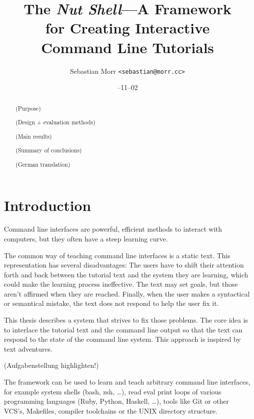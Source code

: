 \documentclass[paper=a4,twoside,abstract=on,cleardoublepage=empty,numbers=noenddot,toc=bib,12pt]{scrreprt}
\title{The \emph{Nut Shell}---A Framework\\for Creating Interactive\\Command Line Tutorials}
\author{\sffamily Sebastian Morr \texttt{<sebastian@morr.cc>}}
\date{\sffamily 2013--11--02}
\begin{document}
\maketitle
\restoregeometry


\begin{abstract}

    \blindtext

    (Purpose)

    (Design + evaluation methods)

    (Main results)

    (Summary of conclusions)
\end{abstract}

%
\begin{abstract}
    \blindtext

    (German translation)
\end{abstract}
%

\setcounter{tocdepth}{2}
\tableofcontents


\chapter{Introduction}

Command line interfaces are powerful, efficient methods to interact with computers, but they often have a steep learning curve.

The common way of teaching command line interfaces is a static text. This representation has several disadvantages: The users have to shift their attention forth and back between the tutorial text and the system they are learning, which could make the learning process ineffective. The text may set goals, but those aren't affirmed when they are reached. Finally, when the user makes a syntactical or semantical mistake, the text does not respond to help the user fix it.

This thesis describes a system that strives to fix those problems. The core idea is to interlace the tutorial text and the command line output so that the text can respond to the state of the command line system. This approach is inspired by text adventures.

(Aufgabenstellung highlighten!)

The framework can be used to learn and teach arbitrary command line interfaces, for example system shells (bash, zsh, …), read eval print loops of various programming languages (Ruby, Python, Haskell, …), tools like Git or other VCS's, Makefiles, compiler toolchains or the UNIX directory structure.
\end{document}
